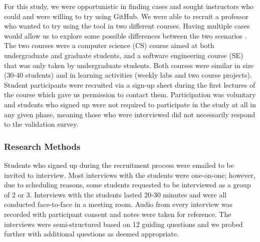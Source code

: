 For this study, we were opportunistic in finding cases and sought instructors who could and were willing to try using GitHub. We were able to recruit a professor who wanted to try using the tool in two different courses. Having multiple cases would allow us to explore some possible differences between the two scenarios \cite{yin2013case}. The two courses were a computer science (CS) course aimed at both undergraduate and graduate students, and a software engineering course (SE) that was only taken by undergraduate students. Both courses were similar in size (30-40 students) and in learning activities (weekly labs and two course projects). Student participants were recruited via a sign-up sheet during the first lectures of the course which gave us permission to contact them. Participation was voluntary and students who signed up were not required to participate in the study at all in any given phase, meaning those who were interviewed did not necessarily respond to the validation survey.


\subsubsection{Research Methods}
Students who signed up during the recruitment process were emailed to be invited to interview. Most interviews with the students were one-on-one; however, due to scheduling reasons, some students requested to be interviewed as a group of 2 or 3. Interviews with the students lasted 20-30 minutes and were all conducted face-to-face in a meeting room. Audio from every interview was recorded with participant consent and notes were taken for reference. The interviews were semi-structured based on 12 guiding questions and we probed further with additional questions as deemed appropriate. %

